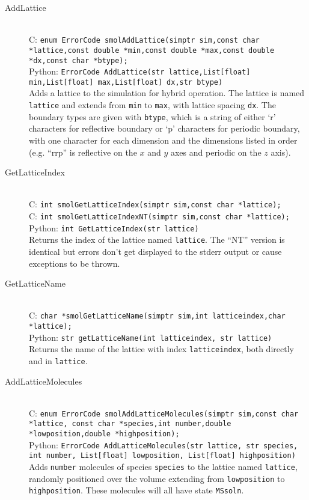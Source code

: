 \documentclass {book}
\begin{document}
\begin{description}

\item[AddLattice]
\hfill \\
C: \texttt{enum ErrorCode smolAddLattice(simptr sim,const char *lattice,const double *min,const double *max,const double *dx,const char *btype);}\\
Python: \texttt{ErrorCode AddLattice(str lattice,List[float] min,List[float] max,List[float] dx,str btype)}\\
Adds a lattice to the simulation for hybrid operation. The lattice is named \texttt{lattice} and extends from \texttt{min} to \texttt{max}, with lattice spacing \texttt{dx}. The boundary types are given with \texttt{btype}, which is a string of either `r' characters for reflective boundary or `p' characters for periodic boundary, with one character for each dimension and the dimensions listed in order (e.g. ``rrp'' is reflective on the $x$ and $y$ axes and periodic on the $z$ axis).

\item[GetLatticeIndex]
\hfill \\
C: \texttt{int smolGetLatticeIndex(simptr sim,const char *lattice);}\\
C: \texttt{int smolGetLatticeIndexNT(simptr sim,const char *lattice);}\\
Python: \texttt{int GetLatticeIndex(str lattice)}\\
Returns the index of the lattice named \texttt{lattice}. The ``NT'' version is identical but errors don't get displayed to the stderr output or cause exceptions to be thrown.

\item[GetLatticeName]
\hfill \\
C: \texttt{char *smolGetLatticeName(simptr sim,int latticeindex,char *lattice);}\\
Python: \texttt{str getLatticeName(int latticeindex, str lattice)}\\
Returns the name of the lattice with index \texttt{latticeindex}, both directly and in \texttt{lattice}.

\item[AddLatticeMolecules]
\hfill \\
C: \texttt{enum ErrorCode smolAddLatticeMolecules(simptr sim,const char *lattice, const char *species,int number,double *lowposition,double *highposition);}\\
Python: \texttt{ErrorCode AddLatticeMolecules(str lattice, str species, int number, List[float] lowposition, List[float] highposition)}\\
Adds \texttt{number} molecules of species \texttt{species} to the lattice named \texttt{lattice}, randomly positioned over the volume extending from \texttt{lowposition} to \texttt{highposition}. These molecules will all have state \texttt{MSsoln}.


\end{description}
\end{document}

